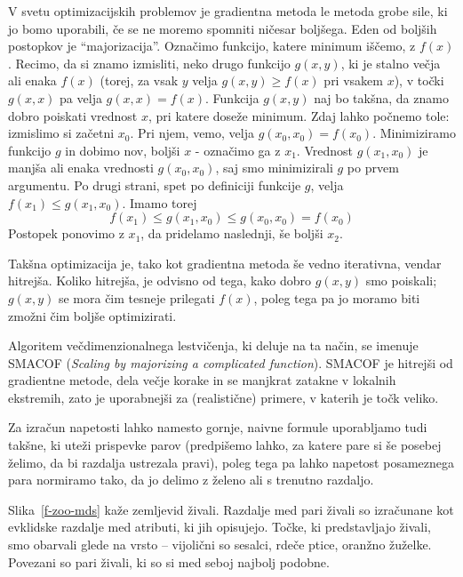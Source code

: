 V svetu optimizacijskih problemov je gradientna metoda le metoda grobe sile, ki jo bomo uporabili, če se ne moremo spomniti ničesar boljšega. Eden od boljših postopkov je ``majorizacija''. Označimo funkcijo, katere minimum iščemo, z $f(x)$. Recimo, da si znamo izmisliti, neko drugo funkcijo $g(x, y)$, ki je stalno večja ali enaka $f(x)$ (torej, za vsak $y$ velja $g(x, y)\ge f(x)$ pri vsakem $x$), v točki $g(x, x)$ pa velja $g(x, x)=f(x)$. Funkcija $g(x, y)$ naj bo takšna, da znamo dobro poiskati vrednost $x$, pri katere doseže minimum. Zdaj lahko počnemo tole: izmislimo si začetni $x_0$. Pri njem, vemo, velja $g(x_0, x_0)=f(x_0)$. Minimiziramo funkcijo $g$ in dobimo nov, boljši $x$ - označimo ga z $x_1$. Vrednost $g(x_1, x_0)$ je manjša ali enaka vrednosti $g(x_0, x_0)$, saj smo minimizirali $g$ po prvem argumentu. Po drugi strani, spet po definiciji funkcije $g$, velja $f(x_1) \le g(x_1, x_0)$. Imamo torej
$$f(x_1) \le g(x_1, x_0) \le g(x_0, x_0) = f(x_0)$$
Postopek ponovimo z $x_1$, da pridelamo naslednji, še boljši $x_2$.

Takšna optimizacija je, tako kot gradientna metoda še vedno iterativna, vendar hitrejša. Koliko hitrejša, je odvisno od tega, kako dobro $g(x, y)$ smo poiskali; $g(x, y)$ se mora čim tesneje prilegati $f(x)$, poleg tega pa jo moramo biti zmožni čim boljše optimizirati.

Algoritem večdimenzionalnega lestvičenja, ki deluje na ta način, se imenuje SMACOF ({\em Scaling by majorizing a complicated function}). SMACOF je hitrejši od gradientne metode, dela večje korake in se manjkrat zatakne v lokalnih ekstremih, zato je uporabnejši za (realistične) primere, v katerih je točk veliko.

Za izračun napetosti lahko namesto gornje, naivne formule uporabljamo tudi takšne, ki uteži prispevke parov (predpišemo lahko, za katere pare si še posebej želimo, da bi razdalja ustrezala pravi), poleg tega pa lahko napetost posameznega para normiramo tako, da jo delimo z želeno ali s trenutno razdaljo.

Slika~\ref{f-zoo-mds} kaže zemljevid živali. Razdalje med pari živali so izračunane kot evklidske razdalje med atributi, ki jih opisujejo. Točke, ki predstavljajo živali, smo obarvali glede na vrsto -- vijolični so sesalci, rdeče ptice, oranžno žuželke. Povezani so pari živali, ki so si med seboj najbolj podobne.

